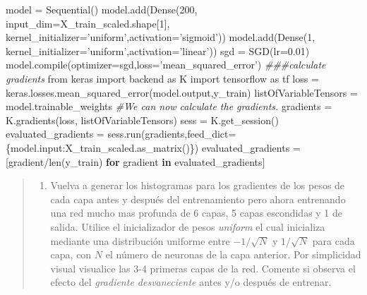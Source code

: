 \documentclass[11pt]{article}
\providecommand{\tightlist}{%
      \setlength{\itemsep}{0pt}\setlength{\parskip}{0pt}}
\newenvironment{Shaded}{}{}
\newcommand{\KeywordTok}[1]{\textcolor[rgb]{0.00,0.44,0.13}{\textbf{{#1}}}}
\newcommand{\DecValTok}[1]{\textcolor[rgb]{0.25,0.63,0.44}{{#1}}}
\newcommand{\FloatTok}[1]{\textcolor[rgb]{0.25,0.63,0.44}{{#1}}}
\newcommand{\StringTok}[1]{\textcolor[rgb]{0.25,0.44,0.63}{{#1}}}
\newcommand{\CommentTok}[1]{\textcolor[rgb]{0.38,0.63,0.69}{\textit{{#1}}}}
\newcommand{\NormalTok}[1]{{#1}}
\newcommand{\ImportTok}[1]{{#1}}
\newcommand{\ControlFlowTok}[1]{\textcolor[rgb]{0.00,0.44,0.13}{\textbf{{#1}}}}
\newcommand{\OperatorTok}[1]{\textcolor[rgb]{0.40,0.40,0.40}{{#1}}}
\newcommand{\BuiltInTok}[1]{{#1}}
\begin{document}
\begin{Shaded}
\begin{Highlighting}[]
\NormalTok{model }\OperatorTok{=}\NormalTok{ Sequential()}
\NormalTok{model.add(Dense(}\DecValTok{200}\NormalTok{, input_dim}\OperatorTok{=}\NormalTok{X_train_scaled.shape[}\DecValTok{1}\NormalTok{], kernel_initializer}\OperatorTok{=}\StringTok{'uniform'}\NormalTok{,activation}\OperatorTok{=}\StringTok{'sigmoid'}\NormalTok{))}
\NormalTok{model.add(Dense(}\DecValTok{1}\NormalTok{, kernel_initializer}\OperatorTok{=}\StringTok{'uniform'}\NormalTok{,activation}\OperatorTok{=}\StringTok{'linear'}\NormalTok{))}
\NormalTok{sgd }\OperatorTok{=}\NormalTok{ SGD(lr}\OperatorTok{=}\FloatTok{0.01}\NormalTok{)}
\NormalTok{model.}\BuiltInTok{compile}\NormalTok{(optimizer}\OperatorTok{=}\NormalTok{sgd,loss}\OperatorTok{=}\StringTok{'mean_squared_error'}\NormalTok{)}
\CommentTok{###calculate gradients}
\ImportTok{from}\NormalTok{ keras }\ImportTok{import}\NormalTok{ backend }\ImportTok{as}\NormalTok{ K}
\ImportTok{import}\NormalTok{ tensorflow }\ImportTok{as}\NormalTok{ tf}
\NormalTok{loss }\OperatorTok{=}\NormalTok{ keras.losses.mean_squared_error(model.output,y_train)}
\NormalTok{listOfVariableTensors }\OperatorTok{=}\NormalTok{ model.trainable_weights}
\CommentTok{#We can now calculate the gradients.}
\NormalTok{gradients }\OperatorTok{=}\NormalTok{ K.gradients(loss, listOfVariableTensors)}
\NormalTok{sess }\OperatorTok{=}\NormalTok{ K.get_session()}
\NormalTok{evaluated_gradients }\OperatorTok{=}\NormalTok{ sess.run(gradients,feed_dict}\OperatorTok{=}\NormalTok{\{model.}\BuiltInTok{input}\NormalTok{:X_train_scaled.as_matrix()\})}
\NormalTok{evaluated_gradients }\OperatorTok{=}\NormalTok{ [gradient}\OperatorTok{/}\BuiltInTok{len}\NormalTok{(y_train) }\ControlFlowTok{for}\NormalTok{ gradient }\KeywordTok{in}\NormalTok{ evaluated_gradients]}
\end{Highlighting}
\end{Shaded}

\begin{quote}
\begin{enumerate}
\def\labelenumi{\alph{enumi})}
\setcounter{enumi}{2}
\tightlist
\item
  Vuelva a generar los histogramas para los gradientes de los pesos de
  cada capa antes y después del entrenamiento pero ahora entrenando una
  red mucho mas profunda de 6 capas, 5 capas escondidas y 1 de salida.
  Utilice el inicializador de pesos \emph{uniform} el cual inicializa
  mediante una distribución uniforme entre \(-1/\sqrt{N}\) y
  \(1/\sqrt{N}\) para cada capa, con \(N\) el número de neuronas de la
  capa anterior. Por simplicidad visual visualice las 3-4 primeras capas
  de la red. Comente si observa el efecto del \emph{gradiente
  desvaneciente} antes y/o después de entrenar.
\end{enumerate}
\end{quote}
\end{document}
